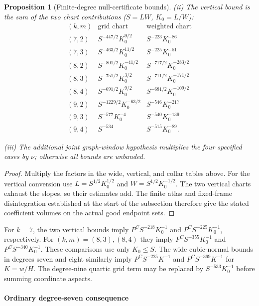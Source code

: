 \documentclass[11pt]{amsart}
\makeatletter
\newtheorem{proposition}[theorem]{Proposition}
\theoremstyle{definition}
\theoremstyle{remark}
\numberwithin{equation}{section}
\newcommand{\equationalias}[1]{\begingroup\protected@edef\@currentlabel{\p@equation\theequation}\protected@edef\@currentHref{equation.\theHequation}\label{#1}\endgroup}
\makeatother
\begin{document}
\begin{proposition}[Finite-degree null-certificate bounds]
\noindent\textup{(ii)} The vertical bound is the sum of the two chart contributions ($S=LW$, $K_0=L/W$):
\begin{equation}\label{surf:finite-vertical}
\begin{array}{c|c|c}
(k,m)&\text{grid chart}&\text{weighted chart}\\\hline
(7,2)&S^{-447/2}K_0^{9/2}&S^{-223}K_0^{-86}\\
(7,3)&S^{-463/2}K_0^{11/2}&S^{-225}K_0^{-51}\\
(8,2)&S^{-801/2}K_0^{-41/2}&S^{-717/2}K_0^{-283/2}\\
(8,3)&S^{-751/2}K_0^{3/2}&S^{-711/2}K_0^{-171/2}\\
(8,4)&S^{-691/2}K_0^{9/2}&S^{-681/2}K_0^{-109/2}\\
(9,2)&S^{-1229/2}K_0^{-63/2}&S^{-546}K_0^{-217}\\
(9,3)&S^{-577}K_0^{-4}&S^{-540}K_0^{-139}\\
(9,4)&S^{-534}&S^{-515}K_0^{-89}.
\end{array}
\end{equation}
\equationalias{low:78:h3n:vertical-tail}\equationalias{low:78:d8q:vertical-bound}

\noindent\textup{(iii)} The additional joint graph-window hypothesis multiplies the four specified cases by $\nu$; otherwise all bounds are unbanded.
\end{proposition}
\begin{proof}
Multiply the factors in the wide, vertical, and collar tables above. For the vertical conversion use $L=S^{1/2}K_0^{1/2}$ and $W=S^{1/2}K_0^{-1/2}$. The two vertical charts exhaust the slopes, so their estimates add. The finite atlas and fixed-frame disintegration established at the start of the subsection therefore give the stated coefficient volumes on the actual good endpoint sets.
\end{proof}

For $k=7$, the two vertical bounds imply $P^CS^{-218}K_0^{-1}$ and $P^CS^{-225}K_0^{-1}$, respectively. For $(k,m)=(8,3),(8,4)$ they imply $P^CS^{-355}K_0^{-1}$ and $P^CS^{-340}K_0^{-1}$. These comparisons use only $K_0\le S$. The wide cubic-normal bounds in degrees seven and eight similarly imply $P^CS^{-225}K^{-1}$ and $P^CS^{-369}K^{-1}$ for $K=w/H$. The degree-nine quartic grid term may be replaced by $S^{-533}K_0^{-1}$ before summing coordinate aspects.
\paragraph{Ordinary degree-seven consequence}
\end{document}
